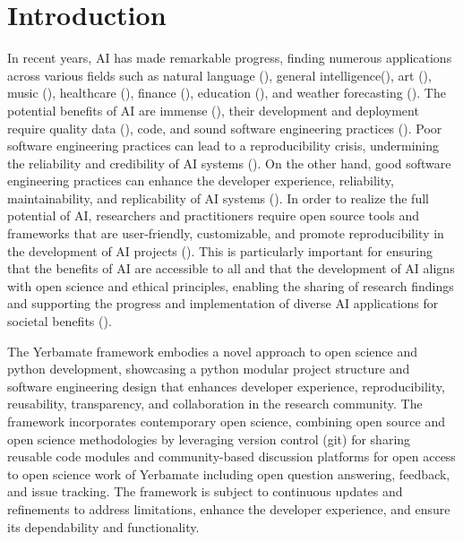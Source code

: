 
\section{Introduction}


 In recent years, AI has made remarkable progress, finding numerous applications across various fields such as natural language (\cite{gpt}), general intelligence(\cite{gato}), art (\cite{diffusion}), music (\cite{musiclm}), healthcare (\cite{aihealthcare}), finance (\cite{bao2022fraudartificial}), education (\cite{aieducation}), and weather forecasting (\cite{weather}). The potential benefits of AI are immense (\cite{beneficialai,potencialaibenefit}), their development and deployment require quality data (\cite{lecun2015deep}), code, and sound software engineering practices (\cite{se4dl,amershi2019software}). Poor software engineering practices can lead to a reproducibility crisis, undermining the reliability and credibility of AI systems (\cite{leakage-recrisis}). On the other hand, good software engineering practices can enhance the developer experience, reliability, maintainability, and replicability of AI systems (\cite{se4dl,amershi2019software, wan2019does}). In order to realize the full potential of AI, researchers and practitioners require open source tools and frameworks that are user-friendly, customizable, and promote reproducibility in the development of AI projects (\cite{lu2022softwareAIReponse,li2018can,wolf2020designing,olson2018system,ong2021guide,gundersen2018reproducible}). This is particularly important for ensuring that the benefits of AI are accessible to all and that the development of AI aligns with open science and ethical principles, enabling the sharing of research findings and supporting the progress and implementation of diverse AI applications for societal benefits (\cite{coro2020open,braun2018open, mittelstadt2016ethics,floridi2018ai4people,ong2021guide}).

The Yerbamate framework embodies a novel approach to open science and python development, showcasing a python modular project structure and software engineering design that enhances developer experience, reproducibility, reusability, transparency, and collaboration in the research community.
The framework incorporates contemporary open science, combining open source and open science methodologies by leveraging version control (git) for sharing reusable code modules and community-based discussion platforms for open access to open science work of Yerbamate including open question answering, feedback, and issue tracking. The framework is subject to continuous updates and refinements to address limitations, enhance the developer experience, and ensure its dependability and functionality. 

